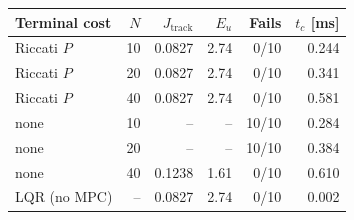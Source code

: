 \begin{tabular}{lrrrrr}
\toprule
Terminal cost & $N$ & $J_\mathrm{track}$ & $E_u$ & Fails & $t_c$ [ms] \\
\midrule
Riccati $P$ & 10 & 0.0827 & 2.74 & 0/10 & 0.244 \\
Riccati $P$ & 20 & 0.0827 & 2.74 & 0/10 & 0.341 \\
Riccati $P$ & 40 & 0.0827 & 2.74 & 0/10 & 0.581 \\
none & 10 & -- & -- & 10/10 & 0.284 \\
none & 20 & -- & -- & 10/10 & 0.384 \\
none & 40 & 0.1238 & 1.61 & 0/10 & 0.610 \\
LQR (no MPC) & -- & 0.0827 & 2.74 & 0/10 & 0.002 \\
\bottomrule
\end{tabular}
